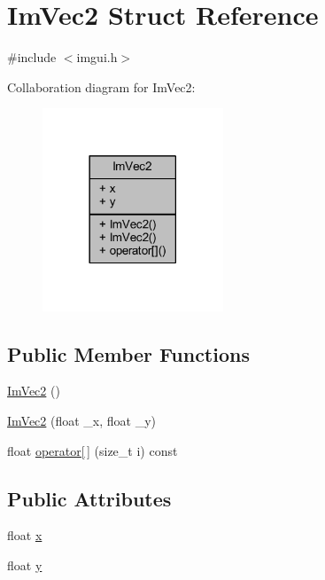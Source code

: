 \hypertarget{struct_im_vec2}{}\section{Im\+Vec2 Struct Reference}
\label{struct_im_vec2}


{\ttfamily \#include $<$imgui.\+h$>$}



Collaboration diagram for Im\+Vec2\+:
\nopagebreak
\begin{figure}[H]
\begin{center}
\leavevmode
\includegraphics[width=153pt]{struct_im_vec2__coll__graph}
\end{center}
\end{figure}
\subsection*{Public Member Functions}
\begin{DoxyCompactItemize}
\item 
\mbox{\hyperlink{struct_im_vec2_a5dfa5ab27cc4af6df3cf8d920fc8a294}{Im\+Vec2}} ()
\item 
\mbox{\hyperlink{struct_im_vec2_af2fd51a6c4bf6290676b235533b92c0d}{Im\+Vec2}} (float \+\_\+x, float \+\_\+y)
\item 
float \mbox{\hyperlink{struct_im_vec2_a91ff3f28020c492f202587b3a1236966}{operator\mbox{[}$\,$\mbox{]}}} (size\+\_\+t i) const
\end{DoxyCompactItemize}
\subsection*{Public Attributes}
\begin{DoxyCompactItemize}
\item 
float \mbox{\hyperlink{struct_im_vec2_a5802a68560961ed8cb8cc5fb2a244c2d}{x}}
\item 
float \mbox{\hyperlink{struct_im_vec2_a1f9d136ca837e147b793b19d25a3a618}{y}}
\end{DoxyCompactItemize}


